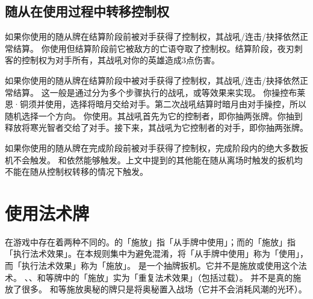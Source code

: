 \subsection{随从在使用过程中转移控制权}

如果你使用的随从牌在结算阶段前被对手获得了控制权，其战吼/连击/抉择依然正常结算。
\example 你使用但结算阶段前它被敌方的亡语夺取了控制权。结算阶段，夜刃刺客的控制权为对手所有，其战吼对你的英雄造成3点伤害。

如果你使用的随从牌在结算阶段中被对手获得了控制权，其战吼/连击/抉择依然正常结算。
\notice 这一般是通过分为多个步骤执行的战吼，或等效果来实现。
\example 你操控布莱恩·铜须并使用，选择将暗月交给对手。第二次战吼结算时暗月由对手操控，所以随机选择一个方向。
\example 你使用。其战吼首先为它的控制者，即你抽两张牌。你抽到释放将寒光智者交给了对手。接下来，其战吼为它控制者的对手，即你抽两张牌。

如果你使用的随从牌在完成阶段前被对手获得了控制权，完成阶段内的绝大多数扳机不会触发。
\exception {}和依然能够触发。上文中提到的其他能在随从离场时触发的扳机均不能在随从控制权转移的情况下触发。

\section{使用法术牌}

\notice 在游戏中存在着两种不同的。的「施放」指「从手牌中使用」；而的「施放」指「执行法术效果」。在本规则集中为避免混淆，将「从手牌中使用」称为「使用」，而「执行法术效果」称为「施放」。
\exception {}是一个抽牌扳机。它并不是施放或使用这个法术。
\exception {}、、和等牌中的「施放」实为「重复法术效果」（包括过载）。
\exception {}并不是真的施放了很多。
\exception {}和等施放奥秘的牌只是将奥秘置入战场（它并不会消耗风潮的光环）。

